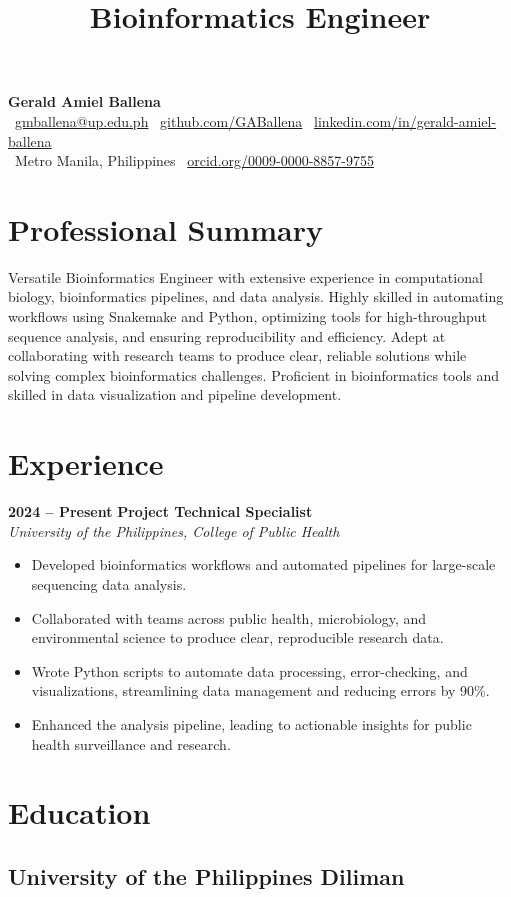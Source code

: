 \documentclass[11pt,a4paper,sans]{moderncv}
\title{Bioinformatics Engineer}
\makeatletter
\renewcommand{\makecvtitle}{
	\vspace*{-2em}
	\begin{center}
		{\Huge \textbf{Gerald Amiel Ballena}} \\[0.5em]
		\faEnvelope \ \href{mailto:gmballena@up.edu.ph}{gmballena@up.edu.ph} \quad
		\faGithub \ \href{https://github.com/GABallena}{github.com/GABallena} \quad
		\faLinkedin \ \href{https://linkedin.com/in/gerald-amiel-ballena}{linkedin.com/in/gerald-amiel-ballena} \\[0.5em]
		\faMapMarker \ Metro Manila, Philippines \quad
		\aiOrcid \ \href{https://orcid.org/0009-0000-8857-9755}{orcid.org/0009-0000-8857-9755}
	\end{center}
	\vspace{1.5em}
}
\makeatother
\begin{document}
	
	\makecvtitle
	
	\section{Professional Summary}
	Versatile Bioinformatics Engineer with extensive experience in computational biology, bioinformatics pipelines, and data analysis. Highly skilled in automating workflows using Snakemake and Python, optimizing tools for high-throughput sequence analysis, and ensuring reproducibility and efficiency. Adept at collaborating with research teams to produce clear, reliable solutions while solving complex bioinformatics challenges. Proficient in bioinformatics tools and skilled in data visualization and pipeline development.
	
	\section{Experience}
	\textbf{2024 – Present} \hfill \textbf{Project Technical Specialist} \\
	\textit{University of the Philippines, College of Public Health} \\[-1em]
	\begin{itemize}
		\item Developed bioinformatics workflows and automated pipelines for large-scale sequencing data analysis.
		\item Collaborated with teams across public health, microbiology, and environmental science to produce clear, reproducible research data.
		\item Wrote Python scripts to automate data processing, error-checking, and visualizations, streamlining data management and reducing errors by 90\%.
		\item Enhanced the analysis pipeline, leading to actionable insights for public health surveillance and research.
	\end{itemize}
	
	\section{Education}
	\subsection{University of the Philippines Diliman}
	
\end{document}
